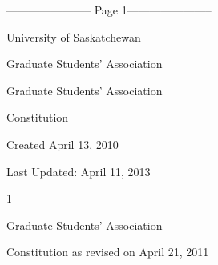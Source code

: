 ----------------------- Page 1-----------------------

     University of Saskatchewan  



Graduate Students’ Association  



                                                              



  



  



    Graduate Students’ Association  



                         Constitution  



                                         



                                         



                                         



                                         



                                         



                                         



                                         



                   Created April  13, 2010  

             Last Updated:  April  11, 2013  

  

  



  



  



                                         

                                      1  



                 Graduate Students’ Association  



          Constitution as revised on April 21, 2011  


